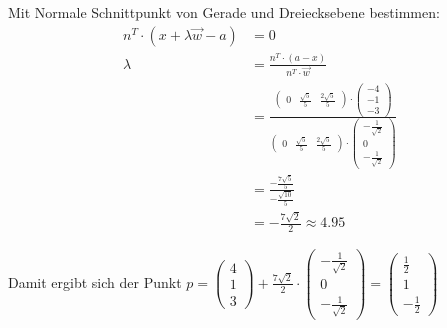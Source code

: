 \documentclass{article}
\begin{document}
Mit Normale Schnittpunkt von Gerade und Dreiecksebene bestimmen:
\begin{align*}
    n^T \cdot (x + \lambda \vec{w} - a) & = 0                                                                                                                                                                                                                                                        \\
    \lambda                             & = \frac{n^T \cdot (a - x)}{n^T \cdot \vec{w}}                                                                                                                                                                                                              \\
                                        & = \frac{\begin{pmatrix} 0 & \frac{\sqrt{5}}{5} &  \frac {2\sqrt{5}}{5} \end{pmatrix} \cdot \begin{pmatrix} -4 \\ -1 \\ -3 \end{pmatrix}}{\begin{pmatrix} 0 & \frac{\sqrt{5}}{5} &  \frac {2\sqrt{5}}{5} \end{pmatrix} \cdot \begin{pmatrix} -\frac{1}{\sqrt{2}} \\ 0 \\ -\frac{1}{\sqrt{2}} \end{pmatrix}} \\
                                        & = \frac{-\frac{7\sqrt{5}}{5}}{-\frac{\sqrt{10}}{5}}                                                                                                                                                                                                                                    \\
                                        & = -\frac{7\sqrt{2}}{2} \approx 4.95
\end{align*}

Damit ergibt sich der Punkt $p = \begin{pmatrix} 4 \\ 1 \\ 3 \end{pmatrix} + \frac{7\sqrt{2}}{2} \cdot \begin{pmatrix} -\frac{1}{\sqrt{2}} \\ 0 \\ -\frac{1}{\sqrt{2}} \end{pmatrix} = \begin{pmatrix} \frac{1}{2} \\ 1 \\ -\frac{1}{2} \end{pmatrix}$
\end{document}
